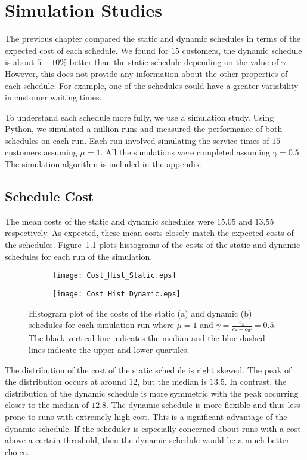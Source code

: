 \chapter{Simulation Studies}
\label{chap:Simulation}
The previous chapter compared the static and dynamic schedules in terms of the expected cost of each schedule. We found for $15$ customers, the dynamic schedule is about $5 - 10 \%$ better than the static schedule depending on the value of $\gamma$. However, this does not provide any information about the other properties of each schedule. For example, one of the schedules could have a greater variability in customer waiting times.

To understand each schedule more fully, we use a simulation study. Using Python, we simulated a million runs and measured the performance of both schedules on each run. Each run involved simulating the service times of $15$ customers assuming $\mu = 1$. All the simulations were completed assuming $\gamma = 0.5$. The simulation algorithm is included in the appendix.

\section{Schedule Cost}
The mean costs of the static and dynamic schedules were $15.05$ and $13.55$ respectively. As expected, these mean costs closely match the expected costs of the schedules. Figure~\ref{fig:Two_Cost} plots histograms of the costs of the static and dynamic schedules for each run of the simulation.
\begin{figure}[htb]
	\centering
	\begin{subfigure}[t]{0.45\textwidth}
		\centering
		\texttt{[image: Cost\_Hist\_Static.eps]}
		\caption{}
	\end{subfigure}
	\begin{subfigure}[t]{0.45\textwidth}
		\centering
		\texttt{[image: Cost\_Hist\_Dynamic.eps]}
		\caption{}
	\end{subfigure}
	\caption{Histogram plot of the costs of the static (a) and dynamic (b) schedules for each simulation run where $\mu = 1$ and $\gamma = \frac{c_{S}}{c_{S} + c_{W}} = 0.5$. The black vertical line indicates the median and the blue dashed lines indicate the upper and lower quartiles.}
	\label{fig:Two_Cost}
\end{figure}

The distribution of the cost of the static schedule is right skewed. The peak of the distribution occurs at around 12, but the median is $13.5$. In contrast, the distribution of the dynamic schedule is more symmetric with the peak occurring closer to the median of $12.8$. The dynamic schedule is more flexible and thus less prone to runs with extremely high cost. This is a significant advantage of the dynamic schedule. If the scheduler is especially concerned about runs with a cost above a certain threshold, then the dynamic schedule would be a much better choice.

